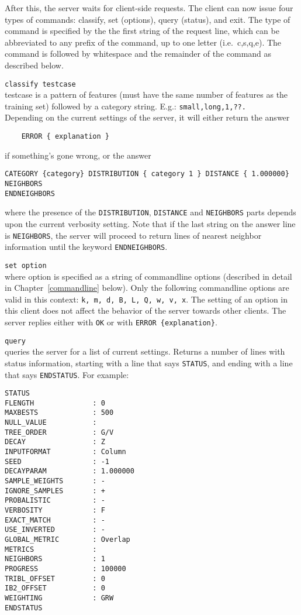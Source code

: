 \documentclass{report}
\begin{document}
After this, the server waits for client-side requests.
The client can now issue four types of commands: classify, set
(options), query (status), and exit. The type of command is specified
by the the first string of the request line, which can be abbreviated
to any prefix of the command, up to one letter (i.e.~c,s,q,e). The
command is followed by whitespace and the remainder of the command as
described below.
\begin{description}
\item {\tt classify testcase}\\
      testcase is a pattern of features (must have the same number of
      features as the training set) followed by a category
      string. E.g.: {\tt small,long,1,??.}\\
      Depending on the current settings of the server, it will either
      return the answer 
      \begin{verbatim}
	ERROR { explanation }
      \end{verbatim}
      if something's gone wrong, or the answer
      \begin{verbatim}
CATEGORY {category} DISTRIBUTION { category 1 } DISTANCE { 1.000000} NEIGHBORS
ENDNEIGHBORS
      \end{verbatim}
      where the presence of the {\tt DISTRIBUTION}, {\tt DISTANCE} and {\tt NEIGHBORS}
parts depends upon the current verbosity setting. Note that if the
last string on the answer line is {\tt NEIGHBORS}, the server will
proceed to return lines of nearest neighbor information until the
keyword {\tt ENDNEIGHBORS}.
\item {\tt set option}\\ where option is specified as a string of
      commandline options (described in detail in
      Chapter~\ref{commandline} below). Only the following commandline
      options are valid in this context: {\tt k, m, d, B, L, Q, w, v,
      x}. The setting of an option in this client does not affect the
      behavior of the server towards other clients. The server replies
      either with {\tt OK} or with {\tt ERROR \{explanation\}}.
\item {\tt query}\\
      queries the server for a list of current settings. Returns a
number of lines with status information, starting with a line that
says {\tt STATUS}, and ending with a line that says {\tt ENDSTATUS}. For example:

\begin{footnotesize}
\begin{verbatim}
STATUS
FLENGTH              : 0
MAXBESTS             : 500
NULL_VALUE           : 
TREE_ORDER           : G/V
DECAY                : Z
INPUTFORMAT          : Column
SEED                 : -1
DECAYPARAM           : 1.000000
SAMPLE_WEIGHTS       : -
IGNORE_SAMPLES       : +
PROBALISTIC          : -
VERBOSITY            : F
EXACT_MATCH          : -
USE_INVERTED         : -
GLOBAL_METRIC        : Overlap
METRICS              : 
NEIGHBORS            : 1
PROGRESS             : 100000
TRIBL_OFFSET         : 0
IB2_OFFSET           : 0
WEIGHTING            : GRW
ENDSTATUS
\end{verbatim}
\end{footnotesize}


\end{description}
\end{document}
